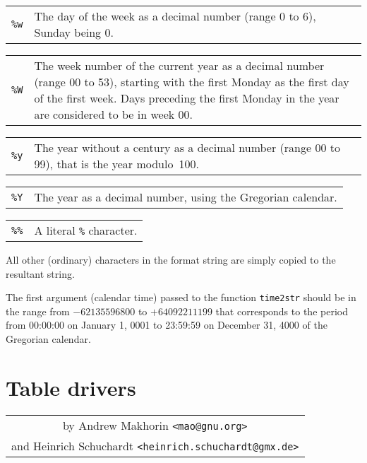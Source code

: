 \documentclass[11pt]{report}
\begin{document}
\begin{tabular}{@{}p{20pt}p{421.5pt}@{}}
{\tt\%w}&The day of the week as a decimal number (range 0 to 6), Sunday
being 0.\\
\end{tabular}

\begin{tabular}{@{}p{20pt}p{421.5pt}@{}}
{\tt\%W}&The week number of the current year as a decimal number (range
00 to 53), starting with the first Monday as the first day of the first
week. Days preceding the first Monday in the year are considered to be
in week 00.\\
\end{tabular}

\begin{tabular}{@{}p{20pt}p{421.5pt}@{}}
{\tt\%y}&The year without a century as a decimal number (range 00 to
99), that is the year modulo~100.\\
\end{tabular}

\begin{tabular}{@{}p{20pt}p{421.5pt}@{}}
{\tt\%Y}&The year as a decimal number, using the Gregorian calendar.\\
\end{tabular}

\begin{tabular}{@{}p{20pt}p{421.5pt}@{}}
{\tt\%\%}&A literal \verb|%| character.\\
\end{tabular}

All other (ordinary) characters in the format string are simply copied
to the resultant string.

The first argument (calendar time) passed to the function {\tt time2str}
should be in the range from $-62135596800$ to $+64092211199$ that
corresponds to the period from 00:00:00 on January 1, 0001 to 23:59:59
on December 31, 4000 of the Gregorian calendar.


\chapter{Table drivers}
\label{drivers}

\noindent\hfil
\begin{tabular}{c}
by Andrew Makhorin \verb|<mao@gnu.org>|\\
and Heinrich Schuchardt \verb|<heinrich.schuchardt@gmx.de>|\\
\end{tabular}
\end{document}

